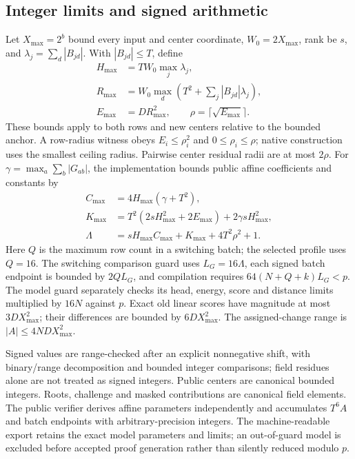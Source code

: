 \subsection{Integer limits and signed arithmetic}
Let $X_{\max}=2^{b}$ bound every input and center coordinate,
$W_0=2X_{\max}$, rank be $s$, and $\lambda_j=\sum_d|B_{jd}|$.
With $|B_{jd}|\leq T$, define
\begin{align}
 H_{\max}&=TW_0\max_j \lambda_j,\\
 R_{\max}&=W_0\max_d\left(T^2+\sum_j|B_{jd}|\lambda_j\right),\\
 E_{\max}&=D R_{\max}^2,\qquad \rho=\lceil\sqrt{E_{\max}}\rceil.
\end{align}
These bounds apply to both rows and new centers relative to the bounded
anchor. A row-radius witness obeys $E_i\leq\rho_i^2$ and $0\leq\rho_i\leq\rho$;
native construction uses the smallest ceiling radius. Pairwise center
residual radii are at most $2\rho$. For $\gamma=\max_a\sum_b|G_{ab}|$, the
implementation bounds public affine coefficients and constants by
\begin{align}
 C_{\max}&=4H_{\max}(\gamma+T^2),\\
 K_{\max}&=T^2(2sH_{\max}^2+2E_{\max})
                         +2\gamma sH_{\max}^2,\\
 \Lambda&=sH_{\max}C_{\max}+K_{\max}+4T^2\rho^2+1.
\end{align}
Here $Q$ is the maximum row count in a switching batch; the selected profile
uses $Q=16$. The switching comparison guard uses $L_G=16\Lambda$, each signed batch endpoint
is bounded by $2Q L_G$, and compilation requires
$64(N+Q+k)L_G<p$. The model guard separately checks its head, energy,
score and distance limits multiplied by $16N$ against $p$. Exact old
linear scores have magnitude at most $3DX_{\max}^2$; their differences are bounded
by $6DX_{\max}^2$. The assigned-change range is $|A|\leq4NDX_{\max}^2$.

Signed values are range-checked after an explicit nonnegative shift, with
binary/range decomposition and bounded integer comparisons; field residues
alone are not treated as signed integers. Public centers are canonical
bounded integers. Roots, challenge and masked contributions are canonical
field elements. The public verifier derives affine parameters independently
and accumulates $T^6A$ and batch endpoints with arbitrary-precision integers.
The machine-readable export retains the exact model parameters and limits;
an out-of-guard model is excluded before accepted proof generation rather
than silently reduced modulo $p$.

